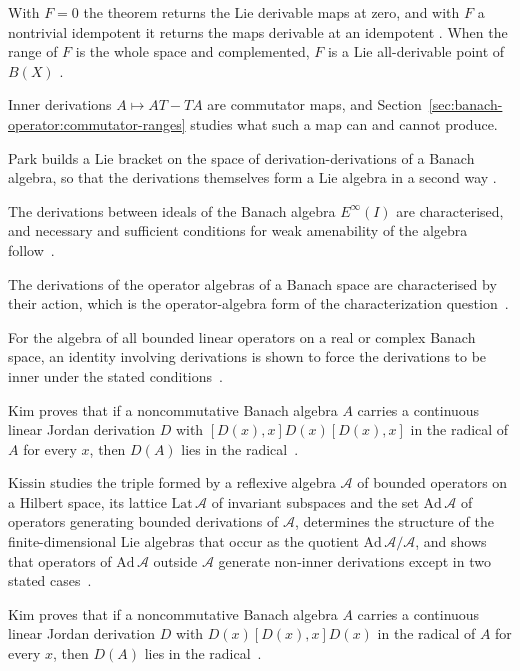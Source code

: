With $F=0$ the theorem returns the Lie derivable maps at zero, and with $F$ a
nontrivial idempotent it returns the maps derivable at an idempotent
\cite[Remark~2.4, p.~81]{LiuHou2025Lie}. When the range of $F$ is the whole
space and complemented, $F$ is a Lie all-derivable point of $B(X)$
\cite[Corollary~2.3, p.~81]{LiuHou2025Lie}.

Inner derivations $A\mapsto AT-TA$ are commutator maps, and
Section~\ref{sec:banach-operator:commutator-ranges} studies what such a
map can and cannot produce.

Park builds a Lie bracket on the space of derivation-derivations of a Banach
algebra, so that the derivations themselves form a Lie algebra in a second way
\cite[Abstract, p.~1]{Park2019LieBracket}.

The derivations between ideals of the Banach algebra $E^\infty(I)$ are characterised, and necessary and sufficient conditions for weak amenability of the algebra follow~\cite{WlDerivationsOnMatrixAlgebrasWit2019}.

The derivations of the operator algebras of a Banach space are characterised by their action, which is the operator-algebra form of the characterization question~\cite{WlCharacterizationsOfDerivations2010}.

For the algebra of all bounded linear operators on a real or complex Banach space, an identity involving derivations is shown to force the derivations to be inner under the stated conditions~\cite{WlAnIdentityRelatedToDerivations2018}.

Kim proves that if a noncommutative Banach algebra $A$ carries a continuous linear Jordan derivation $D$ with $[D(x),x]D(x)[D(x),x]$ in the radical of $A$ for every $x$, then $D(A)$ lies in the radical~\cite{WlOnTheDerivationsOfSemiprimeRin2000}.

Kissin studies the triple formed by a reflexive algebra $\mathcal{A}$ of bounded operators on a Hilbert space, its lattice $\mathrm{Lat}\,\mathcal{A}$ of invariant subspaces and the set $\mathrm{Ad}\,\mathcal{A}$ of operators generating bounded derivations of $\mathcal{A}$, determines the structure of the finite-dimensional Lie algebras that occur as the quotient $\mathrm{Ad}\,\mathcal{A}/\mathcal{A}$, and shows that operators of $\mathrm{Ad}\,\mathcal{A}$ outside $\mathcal{A}$ generate non-inner derivations except in two stated cases~\cite{WlOnSomeReflexiveAlgebrasOfOpera1984}.

Kim proves that if a noncommutative Banach algebra $A$ carries a continuous linear Jordan derivation $D$ with $D(x)[D(x),x]D(x)$ in the radical of $A$ for every $x$, then $D(A)$ lies in the radical~\cite{WlOnTheDerivationsOfSemiprimeRin2002}.


